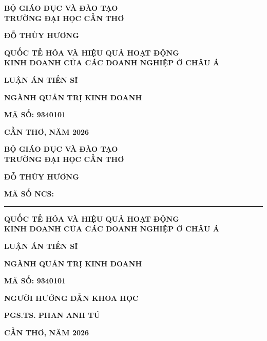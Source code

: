 \documentclass[
  a4paper,
  13pt]{extreport}
\author{}
\date{}
\begin{document}
\thispagestyle{empty}
\begin{center}
{\fontsize{14}{18}\selectfont\bfseries BỘ GIÁO DỤC VÀ ĐÀO TẠO\\TRƯỜNG ĐẠI HỌC CẦN THƠ}

\vspace{2.2cm}
{\fontsize{14}{18}\selectfont\bfseries ĐỖ THÙY HƯƠNG}

\vspace{2.4cm}
{\fontsize{20}{26}\selectfont\bfseries QUỐC TẾ HÓA VÀ HIỆU QUẢ HOẠT ĐỘNG\\KINH DOANH CỦA CÁC DOANH NGHIỆP Ở CHÂU Á}

\vspace{2.4cm}
{\fontsize{14}{18}\selectfont\bfseries LUẬN ÁN TIẾN SĨ}

{\fontsize{14}{18}\selectfont\bfseries NGÀNH QUẢN TRỊ KINH DOANH}

{\fontsize{14}{18}\selectfont\bfseries MÃ SỐ: 9340101}

\vspace{2.8cm}
{\fontsize{14}{18}\selectfont\bfseries CẦN THƠ, NĂM 2026}
\end{center}
\newpage

\thispagestyle{empty}
\begin{center}
{\fontsize{14}{18}\selectfont\bfseries BỘ GIÁO DỤC VÀ ĐÀO TẠO\\TRƯỜNG ĐẠI HỌC CẦN THƠ}

\vspace{1.6cm}
{\fontsize{14}{18}\selectfont\bfseries ĐỖ THÙY HƯƠNG}

{\fontsize{14}{18}\selectfont\bfseries MÃ SỐ NCS: \rule{3cm}{0.4pt}}

\vspace{1.6cm}
{\fontsize{20}{26}\selectfont\bfseries QUỐC TẾ HÓA VÀ HIỆU QUẢ HOẠT ĐỘNG\\KINH DOANH CỦA CÁC DOANH NGHIỆP Ở CHÂU Á}

\vspace{1.6cm}
{\fontsize{14}{18}\selectfont\bfseries LUẬN ÁN TIẾN SĨ}

{\fontsize{14}{18}\selectfont\bfseries NGÀNH QUẢN TRỊ KINH DOANH}

{\fontsize{14}{18}\selectfont\bfseries MÃ SỐ: 9340101}

\vspace{1.4cm}
{\fontsize{13}{17}\selectfont\bfseries NGƯỜI HƯỚNG DẪN KHOA HỌC}

{\fontsize{13}{17}\selectfont\bfseries PGS.TS. PHAN ANH TÚ}

\vspace{1.4cm}
{\fontsize{14}{18}\selectfont\bfseries CẦN THƠ, NĂM 2026}
\end{center}
\newpage
\end{document}
